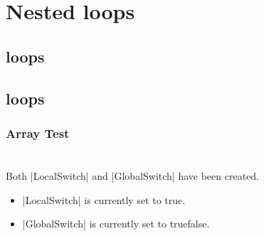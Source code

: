 \section{Nested loops}
{\singlespacing

    \subsection{ loops}
        
    \subsection{ loops}
        
        \subsubsection{Array Test}
}


\section{}
\newif\ifLocalSwitch\LocalSwitchtrue
{}\GlobalSwitchtrue
Both |LocalSwitch| and |GlobalSwitch| have been created.
\begin{itemize}
    \item |LocalSwitch| is currently set to \ifLocalSwitch true\else false\fi.
    \item |GlobalSwitch| is currently set to \ifGlobalSwitch true\else false\fi.
\end{itemize}

